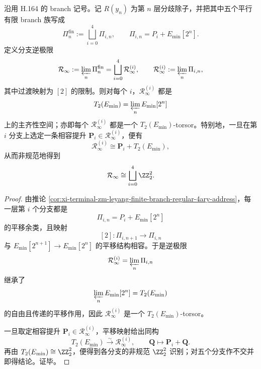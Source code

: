 \begin{theorem}\label{thm:xi-time-part62d-leyang-branch-inverse-limit-five-torsors}
沿用 H.164 的 branch 记号。记 \(R(y_n)\) 为第 \(n\) 层分歧除子，并把其中五个平行有限 branch 族写成
\[
\Pi_n^{\mathrm{fin}}:=\bigsqcup_{i=0}^{4}\Pi_{i,n},
\qquad
\Pi_{i,n}=P_i+E_{\min}[2^n].
\]
定义分支逆极限
\[
\mathcal R_\infty:=\varprojlim_n \Pi_n^{\mathrm{fin}}
=
\bigsqcup_{i=0}^{4}\mathcal R_\infty^{(i)},
\qquad
\mathcal R_\infty^{(i)}:=\varprojlim_n \Pi_{i,n},
\]
其中过渡映射为 \([2]\) 的限制。则对每个 \(i\)，\(\mathcal R_\infty^{(i)}\) 都是
\[
T_2(E_{\min})=\varprojlim_n E_{\min}[2^n]
\]
上的主齐性空间；亦即每个 \(\mathcal R_\infty^{(i)}\) 都是一个 \(T_2(E_{\min})\)-torsor。特别地，一旦在第 \(i\) 分支上选定一条相容提升 \(\mathbf P_i\in \mathcal R_\infty^{(i)}\)，便有
\[
\mathcal R_\infty^{(i)}\cong \mathbf P_i+T_2(E_{\min}),
\]
从而非规范地得到
\[
\mathcal R_\infty\cong \bigsqcup_{i=0}^{4}\ZZ_2^2.
\]
\end{theorem}
\begin{proof}
由推论 \ref{cor:xi-terminal-zm-leyang-finite-branch-regular-4ary-address}，每一层第 \(i\) 个分支都是
\[
\Pi_{i,n}=P_i+E_{\min}[2^n]
\]
的平移余类，且映射
\[
[2]:\Pi_{i,n+1}\longrightarrow \Pi_{i,n}
\]
与 \(E_{\min}[2^{n+1}]\to E_{\min}[2^n]\) 的平移结构相容。于是逆极限
\[
\mathcal R_\infty^{(i)}=\varprojlim_n \Pi_{i,n}
\]
继承了
\[
\varprojlim_n E_{\min}[2^n]=T_2(E_{\min})
\]
的自由且传递的平移作用，因此 \(\mathcal R_\infty^{(i)}\) 是一个 \(T_2(E_{\min})\)-torsor。

一旦取定相容提升 \(\mathbf P_i\in \mathcal R_\infty^{(i)}\)，平移映射给出同构
\[
T_2(E_{\min})\stackrel{\sim}{\longrightarrow}\mathcal R_\infty^{(i)},
\qquad
\mathbf Q\longmapsto \mathbf P_i+\mathbf Q.
\]
再由 \(T_2(E_{\min})\cong \ZZ_2^2\)，便得到各分支的非规范 \(\ZZ_2^2\) 识别；对五个分支作不交并即得结论。证毕。
\end{proof}

